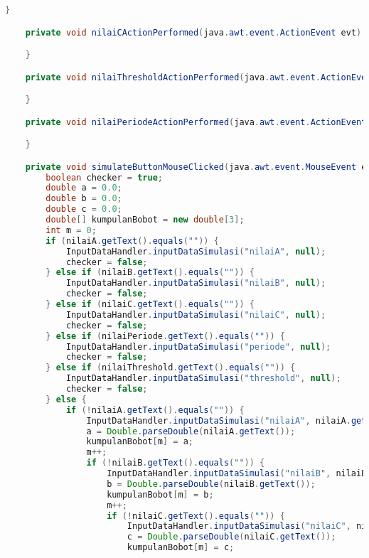 \begin{lstlisting}[language=Java, caption=Entrepreneurs.java]
    }                                      

    private void nilaiCActionPerformed(java.awt.event.ActionEvent evt) {                                       

    }                                      

    private void nilaiThresholdActionPerformed(java.awt.event.ActionEvent evt) {                                               

    }                                              

    private void nilaiPeriodeActionPerformed(java.awt.event.ActionEvent evt) {                                             

    }                                            

    private void simulateButtonMouseClicked(java.awt.event.MouseEvent evt) {                                            
        boolean checker = true;
        double a = 0.0;
        double b = 0.0;
        double c = 0.0;
        double[] kumpulanBobot = new double[3];
        int m = 0;
        if (nilaiA.getText().equals("")) {
            InputDataHandler.inputDataSimulasi("nilaiA", null);
            checker = false;
        } else if (nilaiB.getText().equals("")) {
            InputDataHandler.inputDataSimulasi("nilaiB", null);
            checker = false;
        } else if (nilaiC.getText().equals("")) {
            InputDataHandler.inputDataSimulasi("nilaiC", null);
            checker = false;
        } else if (nilaiPeriode.getText().equals("")) {
            InputDataHandler.inputDataSimulasi("periode", null);
            checker = false;
        } else if (nilaiThreshold.getText().equals("")) {
            InputDataHandler.inputDataSimulasi("threshold", null);
            checker = false;
        } else {
            if (!nilaiA.getText().equals("")) {
                InputDataHandler.inputDataSimulasi("nilaiA", nilaiA.getText());
                a = Double.parseDouble(nilaiA.getText());
                kumpulanBobot[m] = a;
                m++;
                if (!nilaiB.getText().equals("")) {
                    InputDataHandler.inputDataSimulasi("nilaiB", nilaiB.getText());
                    b = Double.parseDouble(nilaiB.getText());
                    kumpulanBobot[m] = b;
                    m++;
                    if (!nilaiC.getText().equals("")) {
                        InputDataHandler.inputDataSimulasi("nilaiC", nilaiC.getText());
                        c = Double.parseDouble(nilaiC.getText());
                        kumpulanBobot[m] = c;

\end{lstlisting}
